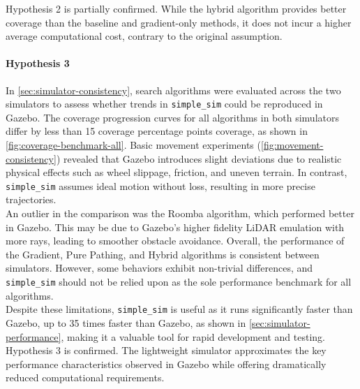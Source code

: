 Hypothesis 2 is partially confirmed. While the hybrid algorithm provides better coverage than the baseline and gradient-only methods, it does not incur a higher average computational cost, contrary to the original assumption.

\paragraph{Hypothesis 3}
In \cref{sec:simulator-consistency}, search algorithms were evaluated across the two simulators to assess whether trends in \texttt{simple\_sim} could be reproduced in Gazebo. The coverage progression curves for all algorithms in both simulators differ by less than 15 coverage percentage points coverage, as shown in \cref{fig:coverage-benchmark-all}. Basic movement experiments (\cref{fig:movement-consistency}) revealed that Gazebo introduces slight deviations due to realistic physical effects such as wheel slippage, friction, and uneven terrain. In contrast, \texttt{simple\_sim} assumes ideal motion without loss, resulting in more precise trajectories. \\

An outlier in the comparison was the Roomba algorithm, which performed better in Gazebo. This may be due to Gazebo’s higher fidelity LiDAR emulation with more rays, leading to smoother obstacle avoidance. Overall, the performance of the Gradient, Pure Pathing, and Hybrid algorithms is consistent between simulators. However, some behaviors exhibit non-trivial differences, and \texttt{simple\_sim} should not be relied upon as the sole performance benchmark for all algorithms. \\

Despite these limitations, \texttt{simple\_sim} is useful as it runs significantly faster than Gazebo, up to 35 times faster than Gazebo, as shown in \cref{sec:simulator-performance}, making it a valuable tool for rapid development and testing. \\

Hypothesis 3 is confirmed. The lightweight simulator approximates the key performance characteristics observed in Gazebo while offering dramatically reduced computational requirements.
